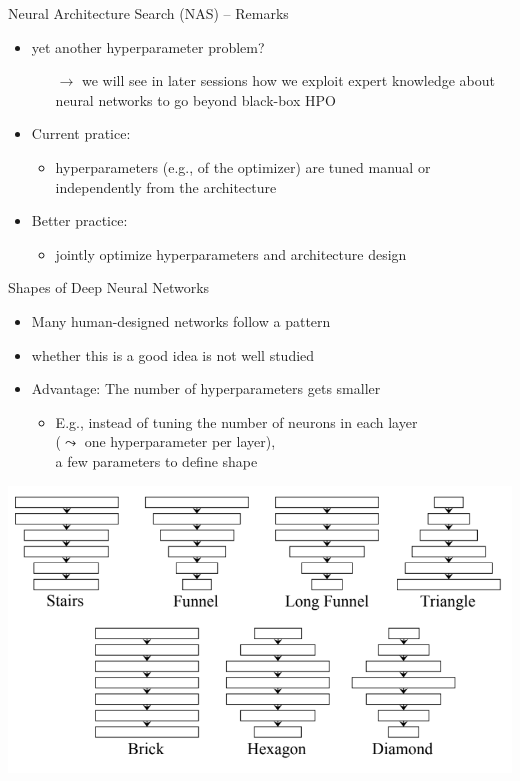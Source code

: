 \begin{frame}[c]{Neural Architecture Search (NAS) -- Remarks}

\begin{itemize}
  \item yet another hyperparameter problem?
  \begin{itemize}
    \item[$\to$] we will see in later sessions how we exploit expert knowledge about neural networks to go beyond black-box HPO
  \end{itemize}
  \pause
  \bigskip
  \item Current pratice: 
  \begin{itemize}
    \item hyperparameters (e.g., of the optimizer) are tuned manual or independently from the architecture
  \end{itemize}
  \pause
  \item Better practice:
  \begin{itemize}
    \item jointly optimize hyperparameters and architecture design\\ 
  \end{itemize}
\end{itemize}

\end{frame}
\begin{frame}[c]{Shapes of Deep Neural Networks }

\begin{itemize}
  \item Many human-designed networks follow a pattern
  \item whether this is a good idea is not well studied
  \item Advantage: The number of hyperparameters gets smaller
  \begin{itemize}
    \item E.g., instead of tuning the number of neurons in each layer\\ ($\leadsto$ one hyperparameter per layer),\\
          a few parameters to define shape
  \end{itemize} 
\end{itemize}

\medskip
\centering
\includegraphics[width=.6\textwidth]{images/nas_shapes.png}

\end{frame}
